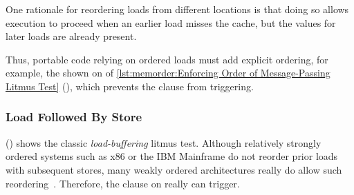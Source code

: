 One rationale for reordering loads from different locations is that doing
so allows execution to proceed when an earlier load misses the cache,
but the values for later loads are already present.

\QuickQuizEnd

\begin{listing}

\caption{Enforcing Order of Message-Passing Litmus Test}
\label{lst:memorder:Enforcing Order of Message-Passing Litmus Test}
\end{listing}

\begin{fcvref}
Thus, portable code relying on ordered loads must
add explicit ordering, for example, the  shown on
 of
\cref{lst:memorder:Enforcing Order of Message-Passing Litmus Test}
(), which prevents
the  clause from triggering.
\end{fcvref}

\begin{listing}

\caption{Load-Buffering Litmus Test (No Ordering)}
\label{lst:memorder:Load-Buffering Litmus Test (No Ordering)}
\end{listing}

\subsubsection{Load Followed By Store}
\label{sec:memorder:Load Followed By Store}

\begin{fcvref}
()
shows the classic \emph{load-buffering} litmus test.
Although relatively strongly ordered systems such as x86
or the IBM Mainframe do not reorder prior loads with subsequent stores,
many weakly ordered architectures really do allow such
reordering~\cite{JadeAlglave2011ppcmem}.
Therefore, the  clause on  really can trigger.
\end{fcvref}

